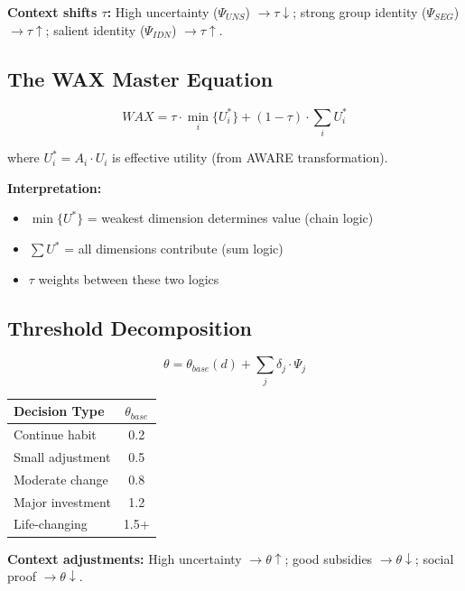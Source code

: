 \textbf{Context shifts $\tau$:} High uncertainty ($\Psi_{UNS}$) $\to \tau \downarrow$; strong group identity ($\Psi_{SEG}$) $\to \tau \uparrow$; salient identity ($\Psi_{IDN}$) $\to \tau \uparrow$.

\subsection{The WAX Master Equation}

\begin{equation}
\boxed{
WAX = \tau \cdot \min_i\{U^*_i\} + (1-\tau) \cdot \sum_i U^*_i
}
\label{eq:mp-wax}
\end{equation}

where $U^*_i = A_i \cdot U_i$ is effective utility (from AWARE transformation).

\textbf{Interpretation:}
\begin{itemize}[nosep]
\item $\min\{U^*\}$ = weakest dimension determines value (chain logic)
\item $\sum U^*$ = all dimensions contribute (sum logic)
\item $\tau$ weights between these two logics
\end{itemize}

\subsection{Threshold Decomposition}

\begin{equation}
\boxed{
\theta = \theta_{base}(d) + \sum_j \delta_j \cdot \Psi_j
}
\label{eq:mp-theta}
\end{equation}

\begin{center}
\renewcommand{\arraystretch}{1.2}
\small
\begin{tabular}{@{}lc@{}}
\toprule
\textbf{Decision Type} & $\theta_{base}$ \\
\midrule
Continue habit & 0.2 \\
Small adjustment & 0.5 \\
Moderate change & 0.8 \\
Major investment & 1.2 \\
Life-changing & 1.5+ \\
\bottomrule
\end{tabular}
\end{center}

\textbf{Context adjustments:} High uncertainty $\to \theta \uparrow$; good subsidies $\to \theta \downarrow$; social proof $\to \theta \downarrow$.


